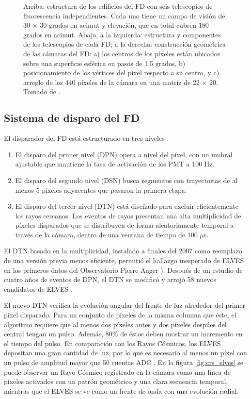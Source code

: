\documentclass[12pt,oneside,openany,letter]{book}
\begin{document}
\begin{figure}
    \caption[]{Arriba: estructura de los edificios del FD con seis telescopios de fluorescencia independientes. Cada uno tiene un campo de visión de 30 $\times$ 30 grados en acimut y elevación, que en total cubren 180 grados en acimut. Abajo, a la izquierda: estructura y componentes de los telescopios de cada FD; a la derecha: construcci\'on geom\'etrica de las c\'amaras del FD: a) los centros de los píxeles est\'an ubicados sobre una superficie esf\'erica en pasos de 1.5 grados, b) posicionamiento de los vértices del píxel respecto a su centro, y c) arreglo de los 440 píxeles de la c\'amara en una matriz de 22 $\times$ 20. Tomado de \cite{AbrahamEtal2010}.}
    \label{fig:fd_scheme}
\end{figure}

\subsection{Sistema de disparo del FD}
El disparador del FD está estructurado en tres niveles \cite{Mussa2019}: 
\begin{enumerate}
    \item El disparo del primer nivel (DPN) opera a nivel del píxel, con un umbral ajustable que mantiene la tasa de activación de los PMT a 100 Hz.
    \item El disparo del segundo nivel (DSN) busca segmentos con trayectorias de al menos 5 píxeles adyacentes que pasaron la primera etapa. 
    \item El disparo del tercer nivel (DTN) está diseñado para excluir eficientemente los rayos cercanos. Los eventos de rayos presentan una alta multiplicidad de píxeles disparados que se distribuyen de forma aleatoriamente temporal a través de la cámara, dentro de una ventana de tiempo de 100 $\mu$s. 
\end{enumerate}

El DTN basado en la multiplicidad, instalado a finales del 2007 como reemplazo de una versi\'on previa menos eficiente, permiti\'o el hallazgo inesperado de ELVES en los primeros datos del Observatorio Pierre Auger \cite{MussaCiaccio2012}). Después de un estudio de cuatro años de eventos de DPN, el DTN se modificó y arrojó 58 nuevos candidatos de ELVES \cite{Mussa2019}.

El nuevo DTN verifica la evoluci\'on angular del frente de luz alrededor del primer p\'ixel disparado. Para un conjunto de p\'ixeles de la misma columna que \'este, el algoritmo requiere que al menos dos p\'ixeles antes y dos p\'ixeles desp\'ues del central tengan un pulso. Adem\'as, 80\% de \'estos deben mostrar un incremento en el tiempo del pulso. En comparación con los Rayos Cósmicos, los ELVES depositan una gran cantidad de luz, por lo que es necesario al menos un píxel con un pulso de amplitud mayor que 50 cuentas ADC \cite{Mussa2019}. En la figura \ref{fig:crs_elves} se puede observar un Rayo C\'osmico registrado en la c\'amara como una l\'inea de p\'ixeles activados con un patr\'on geom\'etrico y una clara secuencia temporal, mientras que el ELVES se ve como un frente de onda con una evolución radial. 
\end{document}

